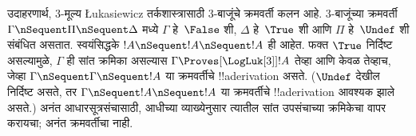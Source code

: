 \documentclass[../../../include/open-logic-section]{subfiles}
\begin{document}
उदाहरणार्थ, $3$-मूल्य \L ukasiewicz तर्कशास्त्रासाठी
$3$-बाजूंचे क्रमवर्ती कलन आहे. $3$-बाजूंच्या क्रमवर्ती
$\Gamma \nSequent \Pi \nSequent \Delta$ मध्ये $\Gamma$
हे~$\False$ शी, $\Delta$ हे~$\True$ शी आणि $\Pi$
हे~$\Undef$ शी संबंधित असतात. स्वयंसिद्धके
$!A \nSequent !A \nSequent !A$ ही आहेत. फक्त $\True$
निर्दिष्ट असल्यामुळे, $\Gamma$ ही सांत क्रमिका असल्यास
$\Gamma \Proves[\LogLuk[3]] !A$
तेव्हा आणि केवळ तेव्हाच, जेव्हा $\Gamma \nSequent \Gamma \nSequent !A$
या क्रमवर्तीचे !!a{derivation} असते. ($\Undef$ देखील निर्दिष्ट
असते, तर $\Gamma \nSequent !A \nSequent !A$ या क्रमवर्तीचे
!!a{derivation} आवश्यक झाले असते.)
अनंत आधारसूत्रसंचासाठी, आधीच्या व्याख्येनुसार त्यातील सांत
उपसंचाच्या क्रमिकेचा वापर करायचा; अनंत क्रमवर्तीचा नाही.
\end{document}
